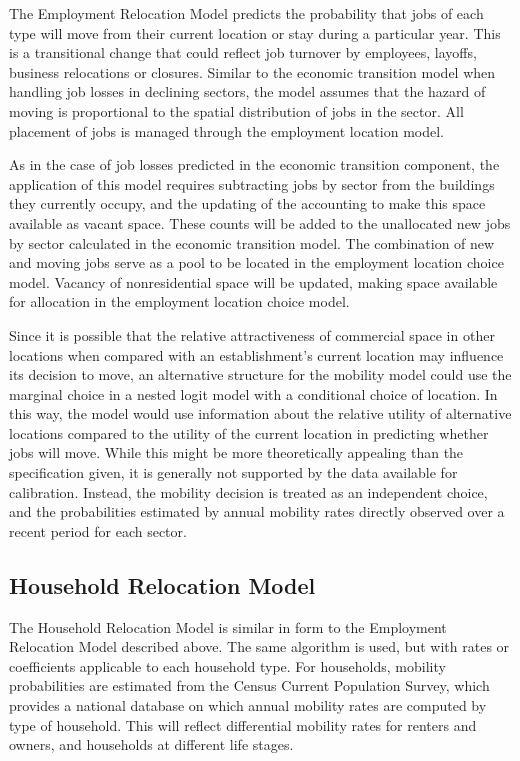 The Employment Relocation Model predicts the probability that jobs
of each type will move from their current location or stay during
a particular year. This is a transitional change that could
reflect job turnover by employees, layoffs, business relocations
or closures. Similar to the economic transition model when
handling job losses in declining sectors, the model assumes that
the hazard of moving is proportional to the spatial distribution
of jobs in the sector.  All placement of jobs is managed through
the employment location model.

As in the case of job losses predicted in the economic transition
component, the application of this model requires subtracting jobs
by sector from the buildings they currently occupy, and the
updating of the accounting to make this space available as vacant
space. These counts will be added to the unallocated new jobs by
sector calculated in the economic transition model. The
combination of new and moving jobs serve as a pool to be located
in the employment location choice model. Vacancy of nonresidential
space will be updated, making space available for allocation in
the employment location choice model.

Since it is possible that the relative attractiveness of
commercial space in other locations when compared with an
establishment's current location may influence its decision to
move, an alternative structure for the mobility model could use
the marginal choice in a nested logit model with a conditional
choice of location. In this way, the model would use information
about the relative utility of alternative locations compared to
the utility of the current location in predicting whether jobs
will move.  While this might be more theoretically appealing than
the specification given, it is generally not supported by the data
available for calibration. Instead, the mobility decision is
treated as an independent choice, and the probabilities estimated
by annual mobility rates directly observed over a recent period
for each sector.


\subsection{Household Relocation Model}

The Household Relocation Model is similar in form to the Employment
Relocation Model described above.  The same algorithm is used, but
with rates or coefficients applicable to each household type.  For
households, mobility probabilities are estimated from the Census
Current Population Survey, which provides a national database on
which annual mobility rates are computed by type of household.
This will reflect differential mobility rates for renters and
owners, and households at different life stages.

